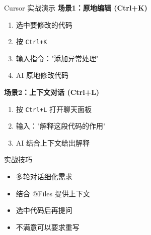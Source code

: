 \begin{frame}{Cursor 实战演示}
	\textbf{场景1：原地编辑 (Ctrl+K)}
	\begin{enumerate}
		\item 选中要修改的代码
		\item 按 \texttt{Ctrl+K}
		\item 输入指令："添加异常处理"
		\item AI 原地修改代码
	\end{enumerate}

	\vspace{0.3cm}

	\textbf{场景2：上下文对话 (Ctrl+L)}
	\begin{enumerate}
		\item 按 \texttt{Ctrl+L} 打开聊天面板
		\item 输入："解释这段代码的作用"
		\item AI 结合上下文给出解释
	\end{enumerate}

	\vspace{0.3cm}

	\begin{block}{实战技巧}
		\begin{itemize}
			\item 多轮对话细化需求
			\item 结合 @Files 提供上下文
			\item 选中代码后再提问
			\item 不满意可以要求重写
		\end{itemize}
	\end{block}
\end{frame}


